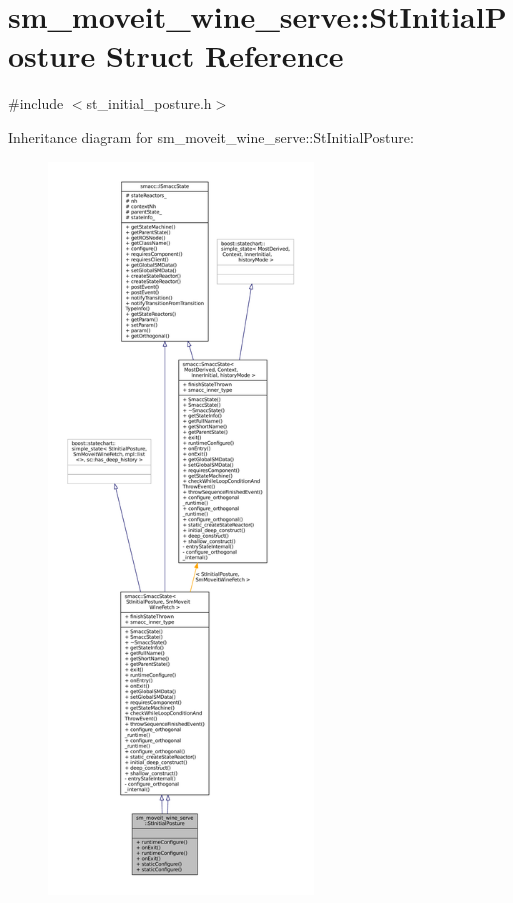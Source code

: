 \hypertarget{structsm__moveit__wine__serve_1_1StInitialPosture}{}\section{sm\+\_\+moveit\+\_\+wine\+\_\+serve\+:\+:St\+Initial\+Posture Struct Reference}
\label{structsm__moveit__wine__serve_1_1StInitialPosture}


{\ttfamily \#include $<$st\+\_\+initial\+\_\+posture.\+h$>$}



Inheritance diagram for sm\+\_\+moveit\+\_\+wine\+\_\+serve\+:\+:St\+Initial\+Posture\+:
\nopagebreak
\begin{figure}[H]
\begin{center}
\leavevmode
\includegraphics[height=550pt]{structsm__moveit__wine__serve_1_1StInitialPosture__inherit__graph}
\end{center}
\end{figure}


